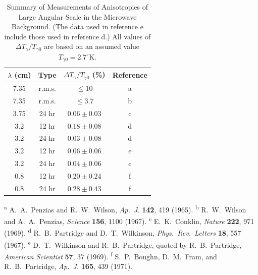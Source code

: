 \begingroup
\renewcommand{\thetable}{15.3}
\begin{table}[htbp]
  \centering
  \caption{Summary of Measurements of Anisotropies of Large Angular Scale in
  the Microwave Background. (The data used in reference e include those used
  in reference d.) All values of \(\Delta T_\gamma/T_{\gamma0}\) are based on
  an assumed value \(T_{\gamma0}=2.7^\circ\mathrm K\).}
  \label{tab:15.3}
  \small
  \begin{tabular}{@{}cccc@{}}
    \toprule
    \(\lambda\) (cm) & Type & \(\Delta T_\gamma/T_{\gamma0}\) (\%) &
    Reference\\
    \midrule
    7.35 & r.m.s. & \(\leq10\) & a\\
    7.35 & r.m.s. & \(\leq3.7\) & b\\
    3.75 & 24 hr & \(0.06\pm0.03\) & c\\
    3.2 & 12 hr & \(0.18\pm0.08\) & d\\
    3.2 & 24 hr & \(0.03\pm0.08\) & d\\
    3.2 & 12 hr & \(0.06\pm0.06\) & e\\
    3.2 & 24 hr & \(0.04\pm0.06\) & e\\
    0.8 & 12 hr & \(0.20\pm0.24\) & f\\
    0.8 & 24 hr & \(0.28\pm0.43\) & f\\
    \bottomrule
  \end{tabular}

  \vspace{0.5em}
  \begin{minipage}{0.92\textwidth}
    \scriptsize
    \textsuperscript{a} A.~A.~Penzias and R.~W.~Wilson, \emph{Ap.\ J.}
    \textbf{142}, 419 (1965).
    \textsuperscript{b} R.~W.~Wilson and A.~A.~Penzias, \emph{Science}
    \textbf{156}, 1100 (1967).
    \textsuperscript{c} E.~K.~Conklin, \emph{Nature} \textbf{222}, 971
    (1969).
    \textsuperscript{d} R.~B.~Partridge and D.~T.~Wilkinson, \emph{Phys.\
    Rev.\ Letters} \textbf{18}, 557 (1967).
    \textsuperscript{e} D.~T.~Wilkinson and R.~B.~Partridge, quoted by
    R.~B.~Partridge, \emph{American Scientist} \textbf{57}, 37 (1969).
    \textsuperscript{f} S.~P.~Boughn, D.~M.~Fram, and R.~B.~Partridge,
    \emph{Ap.\ J.} \textbf{165}, 439 (1971).
  \end{minipage}
\end{table}
\endgroup

